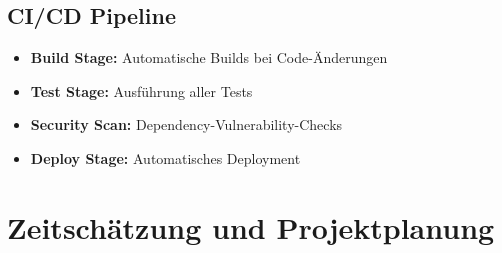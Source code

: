 \documentclass[a4paper,12pt]{article}
\begin{document}
\subsection{CI/CD Pipeline}
\begin{itemize}
    \item \textbf{Build Stage:} Automatische Builds bei Code-Änderungen
    \item \textbf{Test Stage:} Ausführung aller Tests
    \item \textbf{Security Scan:} Dependency-Vulnerability-Checks
    \item \textbf{Deploy Stage:} Automatisches Deployment
\end{itemize}

\section{Zeitschätzung und Projektplanung}
\end{document}
